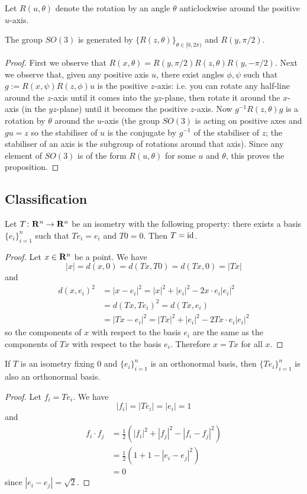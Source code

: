 \documentclass[12pt]{article}
\begin{document}
Let $R(u,\theta)$ denote the rotation by an angle $\theta$ anticlockwise around the positive $u$-axis.

\begin{prp}
  The group $SO(3)$ is generated by $\{R(z,\theta)\}_{\theta\in [0,2\pi)}$ and $R(y,\pi/2)$.
\end{prp}
\begin{proof}
  First we observe that $R(x,\theta)=R(y,\pi/2)R(z,\theta)R(y,-\pi/2)$. Next we observe that, given any positive axis $u$, there exist angles $\phi,\psi$ such that $g:=R(x,\psi)R(z,\phi)u$ is the positive $z$-axis: i.e. you can rotate any half-line around the $z$-axis until it comes into the $yz$-plane, then rotate it around the $x$-axis (in the $yz$-plane) until it becomes the positive $z$-axis. Now $g^{-1}R(z,\theta)g$ is a rotation by $\theta$ around the $u$-axis (the group $SO(3)$ is acting on positive axes and $gu=z$ so the stabiliser of $u$ is the conjugate by $g^{-1}$ of the stabiliser of $z$; the stabiliser of an axis is the subgroup of rotations around that axis). Since any element of $SO(3)$ is of the form $R(u,\theta)$ for some $u$ and $\theta$, this proves the proposition.
\end{proof}


\subsection{Classification}

\begin{lma}\label{lma:isom-fix-simplex}
  Let $T\colon\mathbf{R}^n\to\mathbf{R}^n$ be an isometry with the following property: there exists a basis $\{e_i\}_{i=1}^n$ such that $Te_i=e_i$ and $T0=0$. Then $T=\operatorname{id}$.
\end{lma}
\begin{proof}
  Let $x\in\mathbf{R}^n$ be a point. We have
  \[|x|=d(x,0)=d(Tx,T0)=d(Tx,0)=|Tx|\]
  and
  \begin{align*}
    d(x,e_i)^2&=|x-e_i|^2=|x|^2+|e_i|^2-2x\cdot e_i|e_i|^2\\
    &=d(Tx,Te_i)^2=d(Tx,e_i)\\
    &=|Tx-e_i|^2=|Tx|^2+|e_i|^2-2Tx\cdot e_i|e_i|^2
  \end{align*}
  so the components of $x$ with respect to the basis $e_i$ are the same as the components of $Tx$ with respect to the basis $e_i$. Therefore $x=Tx$ for all $x$.
\end{proof}

\begin{lma}\label{lma:isom-orth-to-orth}
If $T$ is an isometry fixing $0$ and $\{e_i\}_{i=1}^n$ is an orthonormal basis, then $\{Te_i\}_{i=1}^n$ is also an orthonormal basis.
\end{lma}
\begin{proof}
  Let $f_i=Te_i$. We have
  \[|f_i|=|Te_i|=|e_i|=1\]
  and
  \begin{align*}
    f_i\cdot f_j&=\frac{1}{2}\left(|f_i|^2+|f_j|^2-|f_i-f_j|^2\right)\\
    &=\frac{1}{2}(1+1-|e_i-e_j|^2)\\
    &=0
  \end{align*}
  since $|e_i-e_j|=\sqrt{2}$.
\end{proof}
\end{document}
